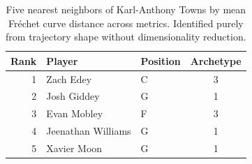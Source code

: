 \begin{table}[htbp]
  \centering\small
  \begin{tabular}{rllc}
    \toprule
    Rank & Player & Position & Archetype \\
    \midrule
    1 & Zach Edey & C & 3 \\
    2 & Josh Giddey & G & 1 \\
    3 & Evan Mobley & F & 3 \\
    4 & Jeenathan Williams & G & 1 \\
    5 & Xavier Moon & G & 1 \\
    \bottomrule
  \end{tabular}
  \caption{Five nearest neighbors of Karl-Anthony Towns by mean Fr\'{e}chet curve distance across metrics. Identified purely from trajectory shape without dimensionality reduction.}
  \label{tab:Karl_Anthony_Towns_frechet_curve_neighbors}
\end{table}

